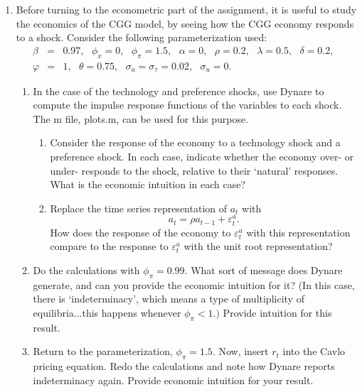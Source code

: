 \begin{enumerate}
\item Before turning to the econometric part of the assignment, it is useful
to study the economics of the CGG model, by seeing how the CGG economy
responds to a shock. Consider the following parameterization used:%
\begin{eqnarray*}
\beta &=&0.97,\text{ }\phi _{x}=0,\text{ }\phi _{\pi }=1.5,\text{ }\alpha =0,%
\text{ }\rho =0.2,\text{ }\lambda =0.5,\text{ }\delta =0.2,\text{ } \\
\varphi &=&1,\text{ }\theta =0.75,\text{ }\sigma _{a}=\sigma _{\tau }=0.02,%
\text{ }\sigma _{u}=0.
\end{eqnarray*}

\begin{enumerate}
\item In the case of the technology and preference shocks, use Dynare to
compute the impulse response functions of the variables to each shock. The m
file, plots.m, can be used for this purpose.

\begin{enumerate}
\item Consider the response of the economy to a technology shock and a
preference shock. In each case, indicate whether the economy over- or under-
responds to the shock, relative to their `natural' responses. What is the
economic intuition in each case?

\item Replace the time series representation of $a_{t}$ with%
\[
a_{t}=\rho a_{t-1}+\varepsilon _{t}^{a}. 
\]%
How does the response of the economy to $\varepsilon _{t}^{a}$ with this
representation compare to the response to $\varepsilon _{t}^{a}$ with the
unit root representation?
\end{enumerate}

\item Do the calculations with $\phi _{\pi }=0.99.$ What sort of message
does Dynare generate, and can you provide the economic intuition for it? (In
this case, there is `indeterminacy', which means a type of multiplicity of
equilibria...this happens whenever $\phi _{\pi }<1.)$ Provide intuition for
this result.

\item Return to the parameterization, $\phi _{\pi }=1.5.$ Now, insert $r_{t}$
into the Cavlo pricing equation. Redo the calculations and note how Dynare
reports indeterminacy again. Provide economic intuition for your result.


\end{enumerate}
\end{enumerate}
